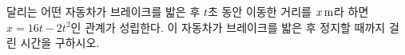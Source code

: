 달리는 어떤 자동차가 브레이크를 밟은 후 $t$초 동안 이동한 거리를 $x\mkern3mu \mathrm{m}$라 하면 $x=16t-2t^2$인 관계가 성립한다. 이 자동차가 브레이크를 밟은 후 정지할 때까지 걸린 시간을 구하시오.
